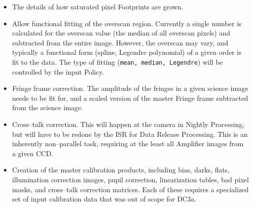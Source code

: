 \begin{itemize}

\item The details of how saturated pixel Footprints are grown.

\item Allow functional fitting of the overscan region.  Currently a
single number is calculated for the overscan value (the median of all
overscan pixels) and subtracted from the entire image.  However, the
overscan may vary, and typically a functional form (spline, Legendre
polynomial) of a given order is fit to the data.  The type of fitting
({\tt mean, median, Legendre}) will be controlled by the input Policy.

\item Fringe frame correction.  The amplitude of the fringes in a
given science image needs to be fit for, and a scaled version of the
master Fringe frame subtracted from the science image.

\item Cross--talk correction.  This will happen at the camera in
Nightly Processing, but will have to be redone by the ISR for Data
Release Processing.  This is an inherently non--parallel task,
requiring at the least all Amplifier images from a given CCD.

\item Creation of the master calibration products, including bias,
darks, flats, illumination correction images, pupil correction,
linearization tables, bad pixel masks, and cross--talk correction
matrices.  Each of these requires a specialized set of input
calibration data that was out of scope for DC3a.

\end{itemize}
